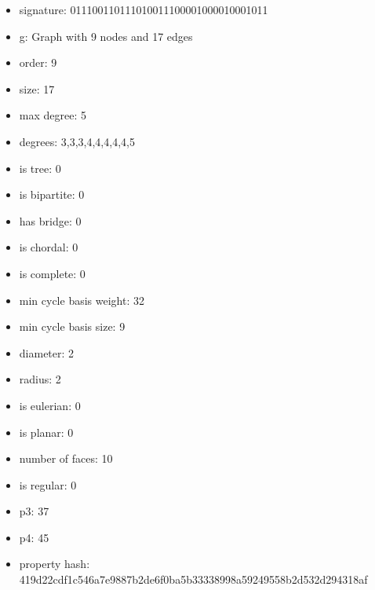 \newpage
\begin{figure}
\end{figure}
\begin{itemize}
\item signature: 011100110111010011100001000010001011
\item g: Graph with 9 nodes and 17 edges
\item order: 9
\item size: 17
\item max degree: 5
\item degrees: 3,3,3,4,4,4,4,4,5
\item is tree: 0
\item is bipartite: 0
\item has bridge: 0
\item is chordal: 0
\item is complete: 0
\item min cycle basis weight: 32
\item min cycle basis size: 9
\item diameter: 2
\item radius: 2
\item is eulerian: 0
\item is planar: 0
\item number of faces: 10
\item is regular: 0
\item p3: 37
\item p4: 45
\item property hash: 419d22cdf1c546a7e9887b2de6f0ba5b33338998a59249558b2d532d294318af
\end{itemize}
